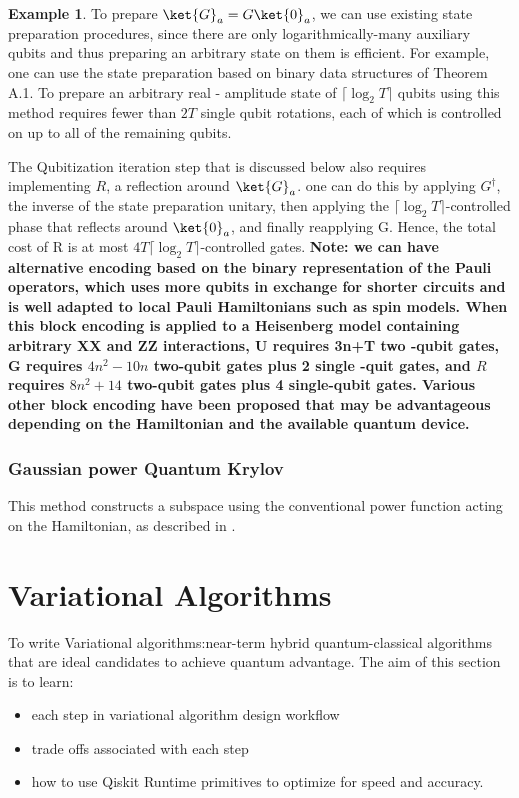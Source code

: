\documentclass[12pt, oneside]{book}
\theoremstyle{definition}
\theoremstyle{definition}
\newtheorem{example}{Example}[section]
\theoremstyle{remark}
\begin{document}
\begin{example}
        To prepare $\ket{G}_a = G\ket{0}_a$, we can use existing state preparation procedures, since there are only logarithmically-many auxiliary qubits and thus preparing an arbitrary state on them is efficient. For example, one can use the state preparation based on binary data structures of \cite{kerenidis_et_al:LIPIcs.ITCS.2017.49} Theorem A.1. To prepare an arbitrary real - amplitude state of $\lceil\log_2 T\rceil$ qubits using this method requires fewer than $2T$ single qubit rotations, each of which is controlled on up to all of the remaining qubits.

        The Qubitization iteration step that is discussed below also requires implementing $R$, a reflection around $\ket{G}_a$. one can do this by applying $G^{\dagger}$, the inverse of the state preparation unitary, then applying the $\lceil \log_2T\rceil$-controlled phase that reflects around $\ket{0}_a$, and finally reapplying G. Hence, the total cost of R is at most $4T\lceil\log_2T\rceil$-controlled gates. \textbf{Note: we can have alternative encoding based on the binary representation of the Pauli operators, which uses more qubits in exchange for shorter circuits and is well adapted to local Pauli Hamiltonians such as spin models. When this block encoding is applied to a Heisenberg model containing arbitrary XX and ZZ interactions, U requires 3n+T two -qubit gates, G requires $4n^2-10n$ two-qubit gates plus 2 single -quit gates, and $R$ requires $8n^2+14$ two-qubit gates plus 4 single-qubit gates. Various other block encoding have been proposed that may be advantageous depending on the Hamiltonian and the available quantum device.}    
    \end{example}

    \subsection{Gaussian power Quantum Krylov}
    This method constructs a subspace using the conventional power function acting on the Hamiltonian, as described in \cite{Zhang_2024}.
    
    






\chapter{Variational Algorithms}
To write Variational algorithms:near-term hybrid quantum-classical algorithms that are ideal candidates to achieve quantum advantage. 
The aim of this section is to learn:
\begin{itemize}
    \item each step in variational algorithm design workflow
    \item trade offs associated with each step
    \item how to use Qiskit Runtime primitives to optimize for speed and accuracy.
\end{itemize}
\end{document}
